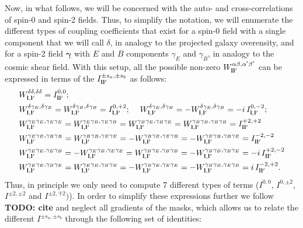 \documentclass[a4paper,11pt]{article}
\newcommand{\todo}[1]{{\bf TODO: #1}}
\begin{document}
    Now, in what follows, we will be concerned with the auto- and cross-correlations of spin-0 and spin-2 fields. Thus, to simplify the notation, we will enumerate the different types of coupling coefficients that exist for a spin-0 field with a single component that we will call $\delta$, in analogy to the projected galaxy overensity, and for a spin-2 field $\mathbf{\gamma}$ with $E$ and $B$ components $\gamma_E$ and $\gamma_B$, in analogy to the cosmic shear field. With this setup, all the possible non-zero $W^{\alpha\beta,\alpha'\beta'}_{{\bf l}{\bf l}'}$ can be expressed in terms of the $I^{\pm s_a,\pm s_b}_{{\bf l}{\bf l}'}$ as follows:
    \begin{align}
      &W^{\delta\delta,\delta\delta}_{{\bf l},{\bf l}'}=I^{0,0}_{{\bf l}{\bf l}'}; \\
      &W^{\delta\gamma_E,\delta\gamma_E}_{{\bf l},{\bf l}'}=W^{\delta\gamma_B,\delta\gamma_B}_{{\bf l},{\bf l}'}=I^{0,+2}_{{\bf l},{\bf l}'};\hspace{12pt}
      W^{\delta\gamma_E,\delta\gamma_B}_{{\bf l},{\bf l}'}=-W^{\delta\gamma_E,\delta\gamma_B}_{{\bf l},{\bf l}'}=-i\,I^{0,-2}_{{\bf l},{\bf l}'};\\
      &W^{\gamma_E\gamma_E,\gamma_E\gamma_E}_{{\bf l},{\bf l}'}=W^{\gamma_E\gamma_B,\gamma_E\gamma_B}_{{\bf l},{\bf l}'}=W^{\gamma_B\gamma_E,\gamma_B\gamma_E}_{{\bf l},{\bf l}'}=W^{\gamma_B\gamma_B,\gamma_B\gamma_B}_{{\bf l},{\bf l}'}=I^{+2,+2}_{{\bf l}{\bf l}'}\\
      &W^{\gamma_E\gamma_E,\gamma_B\gamma_B}_{{\bf l},{\bf l}'}=W^{\gamma_B\gamma_B,\gamma_E\gamma_E}_{{\bf l},{\bf l}'}=-W^{\gamma_B\gamma_E,\gamma_E\gamma_B}_{{\bf l},{\bf l}'}=-W^{\gamma_E\gamma_B,\gamma_B\gamma_E}_{{\bf l},{\bf l}'}=I^{-2,-2}_{{\bf l}{\bf l}'}\\
      &W^{\gamma_E\gamma_E,\gamma_E\gamma_B}_{{\bf l},{\bf l}'}=-W^{\gamma_E\gamma_B,\gamma_E\gamma_E}_{{\bf l},{\bf l}'}=W^{\gamma_B\gamma_E,\gamma_B\gamma_B}_{{\bf l},{\bf l}'}=-W^{\gamma_B\gamma_B,\gamma_B\gamma_E}_{{\bf l},{\bf l}'}=-i\,I^{+2,-2}_{{\bf l}{\bf l}'}\\
      &W^{\gamma_E\gamma_E,\gamma_B\gamma_E}_{{\bf l},{\bf l}'}=W^{\gamma_E\gamma_B,\gamma_B\gamma_B}_{{\bf l},{\bf l}'}=-W^{\gamma_B\gamma_E,\gamma_E\gamma_E}_{{\bf l},{\bf l}'}=-W^{\gamma_B\gamma_B,\gamma_E\gamma_B}_{{\bf l},{\bf l}'}=i\,I^{-2,+2}_{{\bf l}{\bf l}'}.
    \end{align}
    Thus, in principle we only need to compute 7 different types of terms ($I^{0,0}$, $I^{0,\pm2}$, $I^{\pm2,\pm2}$ and $I^{\pm2,\mp2})$). In order to simplify these expressions further we follow \todo{cite} and neglect all gradients of the masks, which allows us to relate the different $I^{\pm s_a,\pm s_b}$ through the following set of identities:
\end{document}
